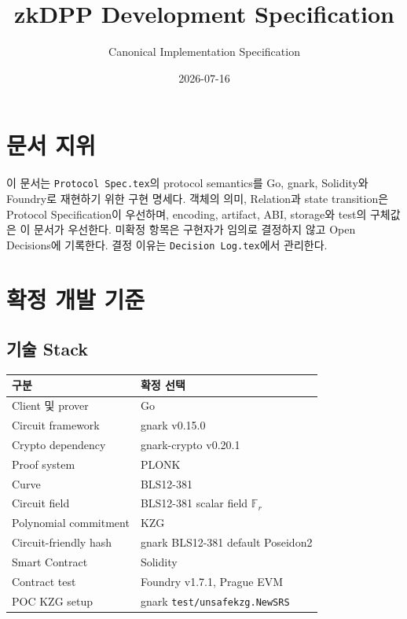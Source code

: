 \documentclass[11pt,a4paper]{extarticle}
\title{zkDPP Development Specification}
\author{Canonical Implementation Specification}
\date{2026-07-16}
\begin{document}
\maketitle

\section*{문서 지위}

이 문서는 \texttt{Protocol Spec.tex}의 protocol semantics를
Go, gnark, Solidity와 Foundry로 재현하기 위한 구현 명세다. 객체의 의미, Relation과
state transition은 Protocol Specification이 우선하며, encoding, artifact, ABI,
storage와 test의 구체값은 이 문서가 우선한다. 미확정 항목은 구현자가 임의로 결정하지
않고 Open Decisions에 기록한다. 결정 이유는
\texttt{Decision Log.tex}에서 관리한다.

\tableofcontents
\newpage

\section{확정 개발 기준}

\subsection{기술 Stack}

\begin{center}
\begin{tabularx}{\textwidth}{@{}lX@{}}
\toprule
구분 & 확정 선택 \\
\midrule
Client 및 prover & Go \\
Circuit framework & gnark v0.15.0 \\
Crypto dependency & gnark-crypto v0.20.1 \\
Proof system & PLONK \\
Curve & BLS12-381 \\
Circuit field & BLS12-381 scalar field $\mathbb{F}_r$ \\
Polynomial commitment & KZG \\
Circuit-friendly hash & gnark BLS12-381 default Poseidon2 \\
Smart Contract & Solidity \\
Contract test & Foundry v1.7.1, Prague EVM \\
POC KZG setup & gnark \texttt{test/unsafekzg.NewSRS} \\
\bottomrule
\end{tabularx}
\end{center}
\end{document}
